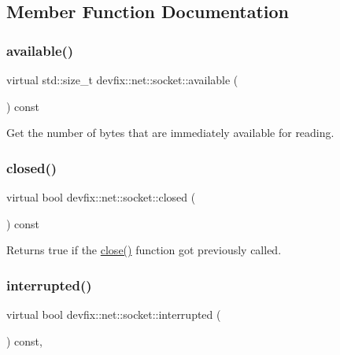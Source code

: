 \subsection{Member Function Documentation}
\mbox{\label{structdevfix_1_1net_1_1socket_ad4b71445fc8888f0f30766de187ce05e}} 
\subsubsection{\texorpdfstring{available()}{available()}}
{\footnotesize\ttfamily virtual std\+::size\+\_\+t devfix\+::net\+::socket\+::available (\begin{DoxyParamCaption}{ }\end{DoxyParamCaption}) const\hspace{0.3cm}{\ttfamily [pure virtual]}}

Get the number of bytes that are immediately available for reading. \mbox{\label{structdevfix_1_1net_1_1socket_ae84cb7f6da7cb70c4e26cab16e17411e}} 
\subsubsection{\texorpdfstring{closed()}{closed()}}
{\footnotesize\ttfamily virtual bool devfix\+::net\+::socket\+::closed (\begin{DoxyParamCaption}{ }\end{DoxyParamCaption}) const\hspace{0.3cm}{\ttfamily [pure virtual]}}

\begin{DoxyReturn}{Returns}
true if the \hyperlink{structdevfix_1_1net_1_1socket_ac82979d2e68f6f740ccfb7937fcd7f67}{close()} function got previously called. 
\end{DoxyReturn}
\mbox{\label{structdevfix_1_1net_1_1socket_a7cfe151f1124d46fb19fad0c374c9352}} 
\subsubsection{\texorpdfstring{interrupted()}{interrupted()}}
{\footnotesize\ttfamily virtual bool devfix\+::net\+::socket\+::interrupted (\begin{DoxyParamCaption}{ }\end{DoxyParamCaption}) const\hspace{0.3cm}{\ttfamily [pure virtual]}, {\ttfamily [noexcept]}}

